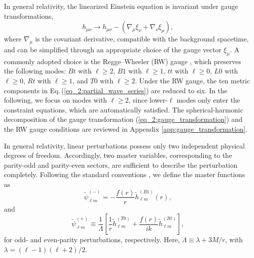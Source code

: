 \documentclass[reprint,amsmath,amssymb,aps,prd]{revtex4-2}
\begin{document}
In general relativity, the linearized Einstein equation is invariant under gauge transformations,
\begin{equation}
\label{eq_2:gauge_transformation}
h_{\mu\nu}\rightarrow h_{\mu\nu}-(\nabla_{\mu}\xi_{\nu}+\nabla_{\nu}\xi_{\mu}),
\end{equation}
where $\nabla_{\mu}$ is the covariant derivative, compatible with the background spacetime, and can be simplified through an appropriate choice of the gauge vector $\xi_\mu$. 
A commonly adopted choice is the Regge–Wheeler (RW) gauge \cite{Regge_Wheeler_1957}, which preserves the following modes: $Bt$ with $\ell\geqslant 2$, $B1$ with $\ell\geqslant 1$, $tt$ with $\ell\geqslant 0$, $L0$ with $\ell\geqslant 0$, $Rt$ with $\ell\geqslant 1$, and $T0$ with $\ell\geqslant 2$.
Under the RW gauge, the ten metric components in Eq.\,(\ref{eq_2:partial_wave_series}) are reduced to six. In the following, we focus on modes with $\ell\geqslant2$, since lower-$\ell$ modes only enter the constraint equations, which are automatically satisfied. The spherical-harmonic decomposition of the gauge transformation (\ref{eq_2:gauge_transformation}) and the RW gauge conditions are reviewed in Appendix \ref{app:gauge_transformation}.

In general relativity, linear perturbations possess only two independent physical degrees of freedom. Accordingly, two master variables, corresponding to the parity-odd and parity-even sectors, are sufficient to describe the perturbation completely. Following the standard conventions \cite{Regge_Wheeler_1957,Zerilli_1970a,Maggiore_2018_b}, we define the master functions as
\begin{equation}
\label{eq:RW_function}
\tilde{\psi}^{(-)}_{\ell m}=-\frac{f(r)}{r}\tilde{h}^{(B1)}_{\ell m}(r),
\end{equation}
and
\begin{equation}
\label{eq:Zerilli_function}
\tilde{\psi}_{\ell m}^{(+)}\equiv\frac{1}{\Lambda}
\left[\frac{1}{r}\tilde{h}_{\ell m}^{(T0)}
+\frac{f(r)}{ik}
\tilde{h}_{\ell m}^{(Rt)}\right],
\end{equation}
for odd- and even-parity perturbations, respectively. Here, $\Lambda\equiv\lambda+3M/r$, with $\lambda=(\ell-1)(\ell+2)/2$.
\end{document}
